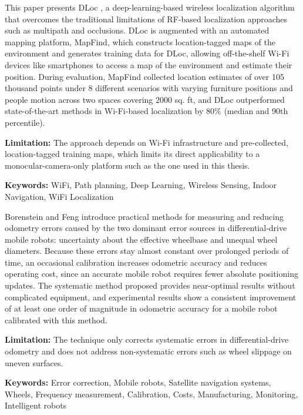 {
	This paper presents DLoc \cite{Ayyalasomayajula:2020}, a deep-learning-based wireless localization algorithm that overcomes the traditional limitations of RF-based localization approaches such as multipath and occlusions. DLoc is augmented with an automated mapping platform, MapFind, which constructs location-tagged maps of the environment and generates training data for DLoc, allowing off-the-shelf Wi-Fi devices like smartphones to access a map of the environment and estimate their position. During evaluation, MapFind collected location estimates of over 105 thousand points under 8 different scenarios with varying furniture positions and people motion across two spaces covering 2000 sq. ft, and DLoc outperformed state-of-the-art methods in Wi-Fi-based localization by 80\% (median and 90th percentile).
	
	\bigskip
	\textbf{Limitation:} The approach depends on Wi-Fi infrastructure and pre-collected, location-tagged training maps, which limits its direct applicability to a monocular-camera-only platform such as the one used in this thesis.
	
	\scriptsize{\textbf{Keywords:} WiFi, Path planning, Deep Learning, Wireless Sensing, Indoor Navigation, WiFi Localization}
}

{
	Borenstein and Feng \cite{Borenstein:1996} introduce practical methods for measuring and reducing odometry errors caused by the two dominant error sources in differential-drive mobile robots: uncertainty about the effective wheelbase and unequal wheel diameters. Because these errors stay almost constant over prolonged periods of time, an occasional calibration increases odometric accuracy and reduces operating cost, since an accurate mobile robot requires fewer absolute positioning updates. The systematic method proposed provides near-optimal results without complicated equipment, and experimental results show a consistent improvement of at least one order of magnitude in odometric accuracy for a mobile robot calibrated with this method.
	
	\bigskip
	\textbf{Limitation:} The technique only corrects systematic errors in differential-drive odometry and does not address non-systematic errors such as wheel slippage on uneven surfaces.
	
	\scriptsize{\textbf{Keywords:} Error correction, Mobile robots, Satellite navigation systems, Wheels, Frequency measurement, Calibration, Costs, Manufacturing, Monitoring, Intelligent robots}
}

